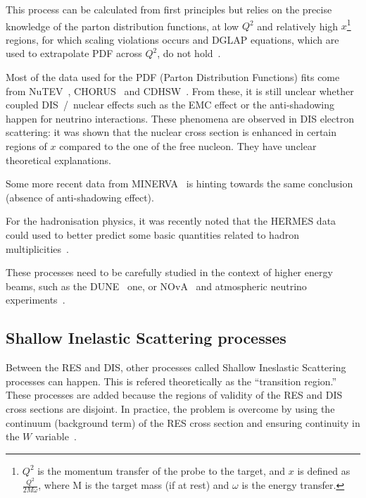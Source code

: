 This process can be calculated from first principles but relies on the
precise knowledge of the parton distribution functions, at low $Q^2$
and relatively high $x$\footnote{$Q^2$ is the momentum transfer of the
  probe to the target, and $x$ is defined as $\frac{Q^2}{2M\omega}$,
  where M is the target mass (if at rest) and $\omega$ is the energy
  transfer.\label{ftn:qsquare}} regions, for which scaling violations
occurs and DGLAP equations, which are used to extrapolate \Gls{PDF}
across $Q^2$, do not hold~\cite{DGLAP1,DGLAP2,DGLAP3,DGLAP4}.

Most of the data used for the \Gls{PDF} (Parton Distribution
Functions) fits come from \Gls{NuTEV}~\cite{nutev},
\Gls{CHORUS}~\cite{chorus} and \Gls{CDHSW}~\cite{CDHSW}. From these,
it is still unclear whether coupled \Gls{DIS}~/~nuclear effects such
as the \Gls{EMC} effect or the \gls{anti-shadowing} happen for
neutrino interactions. These phenomena are observed in \Gls{DIS}
electron scattering: it was shown that the nuclear cross section is
enhanced in certain regions of $x$ compared to the one of the free
nucleon. They have unclear theoretical explanations.

Some more recent data from \Gls{MINERVA}~\cite{Mousseau} is hinting
towards the same conclusion (absence of anti-shadowing effect).

For the hadronisation physics, it was recently noted that the
\Gls{HERMES} data~\cite{HERMES} could used to better predict some
basic quantities related to hadron
multiplicities~\cite{Katori:2014fxa}.

These processes need to be carefully studied in the context of higher
energy beams, such as the \Gls{DUNE}~\cite{DUNE1,DUNE2,DUNE3,DUNE4}
one, or \Gls{NOvA}~\cite{Ayres:2007tu} and atmospheric neutrino
experiments~\cite{Aartsen:2014oha}.

\subsection{Shallow Inelastic Scattering processes}
Between the \Gls{RES} and \Gls{DIS}, other processes called Shallow
Ineslastic Scattering processes can happen. This is refered
theoretically as the ``transition region.'' These processes are added
because the regions of validity of the \Gls{RES} and \Gls{DIS} cross
sections are disjoint. In practice, the problem is overcome by using
the continuum (background term) of the \Gls{RES} cross section and
ensuring continuity in the $W$ variable~\cite{GENIE1}.

